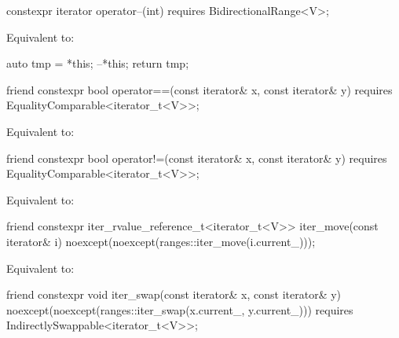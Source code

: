 %
\begin{itemdecl}
constexpr iterator operator--(int) requires BidirectionalRange<V>;
\end{itemdecl}

\begin{itemdescr}
\pnum
\effects Equivalent to:
\begin{codeblock}
auto tmp = *this;
--*this;
return tmp;
\end{codeblock}
\end{itemdescr}

%
\begin{itemdecl}
friend constexpr bool operator==(const iterator& x, const iterator& y)
  requires EqualityComparable<iterator_t<V>>;
\end{itemdecl}

\begin{itemdescr}
\pnum
\effects Equivalent to: 
\end{itemdescr}

%
\begin{itemdecl}
friend constexpr bool operator!=(const iterator& x, const iterator& y)
  requires EqualityComparable<iterator_t<V>>;
\end{itemdecl}

\begin{itemdescr}
\pnum
\effects Equivalent to: 
\end{itemdescr}

%
\begin{itemdecl}
friend constexpr iter_rvalue_reference_t<iterator_t<V>> iter_move(const iterator& i)
  noexcept(noexcept(ranges::iter_move(i.current_)));
\end{itemdecl}

\begin{itemdescr}
\pnum
\effects Equivalent to: 
\end{itemdescr}

%
\begin{itemdecl}
friend constexpr void iter_swap(const iterator& x, const iterator& y)
  noexcept(noexcept(ranges::iter_swap(x.current_, y.current_)))
  requires IndirectlySwappable<iterator_t<V>>;
\end{itemdecl}

